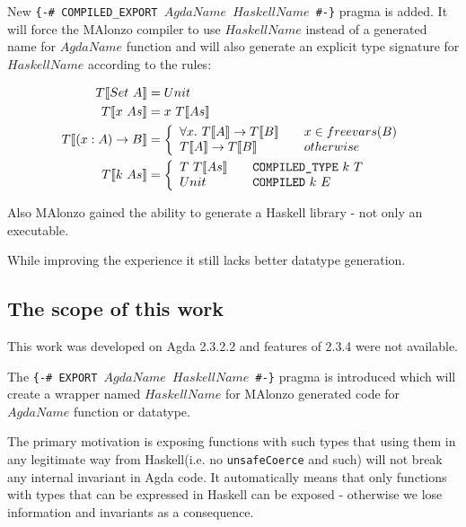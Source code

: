 New \texttt{\{-\# COMPILED\_EXPORT \(AgdaName\) \(HaskellName\) \#-\}} pragma is added.
It will force the MAlonzo compiler to use \(HaskellName\) instead of a generated name for \(AgdaName\) function and will
also generate an explicit type signature for \(HaskellName\) according to the rules:

\begin{align*}
   T\llbracket Set\ A \rrbracket &= Unit\\
   T\llbracket x\ As \rrbracket &= x\ T\llbracket As \rrbracket\\
   T\llbracket (x : A) \rightarrow B \rrbracket &= \left\{
      \begin{array}{l l}
         \forall x.  \ T\llbracket A \rrbracket
            \rightarrow T\llbracket B \rrbracket &\quad x \in freevars(B)\\
         T\llbracket A \rrbracket
            \rightarrow T\llbracket B \rrbracket &\quad otherwise
      \end{array}\right.\\
   T\llbracket k\ As \rrbracket &= \left\{
      \begin{array}{l l}
         T\ T\llbracket As \rrbracket &\quad \texttt{COMPILED\_TYPE}\ k\ T\\
         Unit &\quad \texttt{COMPILED}\ k\ E
      \end{array}\right.
\end{align*}

Also MAlonzo gained the ability to generate a Haskell library - not only an executable.

While improving the experience it still lacks better datatype generation.

\subsection{The scope of this work}

This work was developed on Agda 2.3.2.2 and features of 2.3.4 were not available.

The \texttt{\{-\# EXPORT \(AgdaName\) \(HaskellName\) \#-\}} pragma is introduced which
will create a wrapper named \(HaskellName\) for MAlonzo generated code for \(AgdaName\) function or datatype.

The primary motivation is exposing functions with such types that using them in any legitimate way
from Haskell(i.e. no \texttt{unsafeCoerce} and such) will not break any internal invariant in Agda
code. It automatically means that only functions with types that can be expressed in Haskell can be
exposed - otherwise we lose information and invariants as a consequence.

